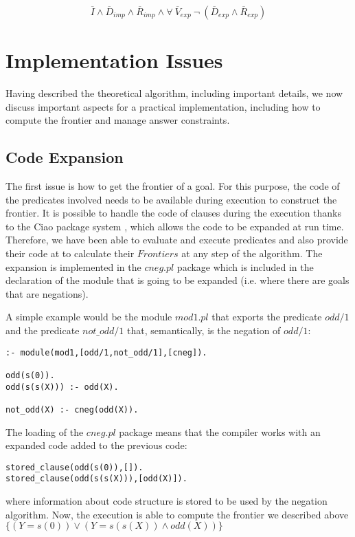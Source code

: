 \documentclass{llncs}
\begin{document}
\begin{itemize}
           \[\overline{I} \wedge \overline{D}_{imp}
           \wedge \overline{R}_{imp} \wedge \forall~
           \overline{V}_{exp}~ \neg~(\overline{D}_{exp} \wedge
           \overline{R}_{exp})\]

         \end{itemize}


    


\section{Implementation Issues}
\label{implementation}

Having described the theoretical algorithm, including important
details, we now discuss important aspects for a practical
implementation, including how to compute the frontier and manage
answer constraints.


\subsection{Code Expansion}
\label{expansion}

The first issue is how to get the frontier of a goal. For this
purpose, the code of the predicates involved needs to be available
during execution to construct the frontier. It is possible to handle
the code of clauses during the execution thanks to the Ciao package
system \cite{ciao-modules-cl2000}, which allows the code to be
expanded at run time.  Therefore, we have been able to evaluate and
execute predicates and also provide their code at to calculate their
$Frontiers$ at any step of the algorithm. The expansion is implemented
in the $cneg.pl$ package which is included in the declaration of
the module that is going to be expanded (i.e. where there are goals
that are negations).

A simple example would be the module $mod1.pl$ that exports the
predicate $odd/1$ and the predicate $not\_odd/1$ that, semantically, is
the negation of $odd/1$:
\begin{verbatim}
:- module(mod1,[odd/1,not_odd/1],[cneg]).

odd(s(0)).
odd(s(s(X))) :- odd(X).

not_odd(X) :- cneg(odd(X)).
\end{verbatim}
The loading of the $cneg.pl$ package means that the compiler works
with an expanded code added to the previous code:
\begin{verbatim}
stored_clause(odd(s(0)),[]).
stored_clause(odd(s(s(X))),[odd(X)]).
\end{verbatim}
where information about code structure is stored to be used by the
negation algorithm. Now, the execution is able to compute the frontier
we described above $\{ ( Y=s(0) ) \vee ( Y=s(s(X)) \wedge odd(X) ) \}$
\end{document}
